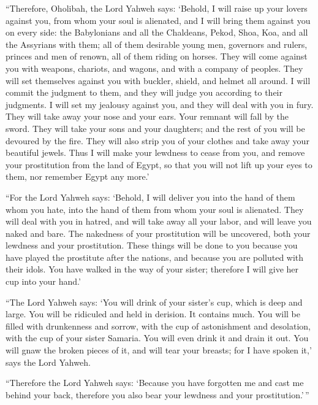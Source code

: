  ``Therefore, Oholibah, the Lord Yahweh says: `Behold, I
will raise up your lovers against you, from whom your soul is alienated,
and I will bring them against you on every side:  the
Babylonians and all the Chaldeans, Pekod, Shoa, Koa, and all the
Assyrians with them; all of them desirable young men, governors and
rulers, princes and men of renown, all of them riding on horses.
 They will come against you with weapons, chariots, and
wagons, and with a company of peoples. They will set themselves against
you with buckler, shield, and helmet all around. I will commit the
judgment to them, and they will judge you according to their judgments.
 I will set my jealousy against you, and they will deal
with you in fury. They will take away your nose and your ears. Your
remnant will fall by the sword. They will take your sons and your
daughters; and the rest of you will be devoured by the fire.
 They will also strip you of your clothes and take away
your beautiful jewels.  Thus I will make your lewdness to
cease from you, and remove your prostitution from the land of Egypt, so
that you will not lift up your eyes to them, nor remember Egypt any
more.'

 ``For the Lord Yahweh says: `Behold, I will deliver you
into the hand of them whom you hate, into the hand of them from whom
your soul is alienated.  They will deal with you in
hatred, and will take away all your labor, and will leave you naked and
bare. The nakedness of your prostitution will be uncovered, both your
lewdness and your prostitution.  These things will be
done to you because you have played the prostitute after the nations,
and because you are polluted with their idols.  You have
walked in the way of your sister; therefore I will give her cup into
your hand.'

 ``The Lord Yahweh says: `You will drink of your sister's
cup, which is deep and large. You will be ridiculed and held in
derision. It contains much.  You will be filled with
drunkenness and sorrow, with the cup of astonishment and desolation,
with the cup of your sister Samaria.  You will even drink
it and drain it out. You will gnaw the broken pieces of it, and will
tear your breasts; for I have spoken it,' says the Lord Yahweh.

 ``Therefore the Lord Yahweh says: `Because you have
forgotten me and cast me behind your back, therefore you also bear your
lewdness and your prostitution.'\,''

